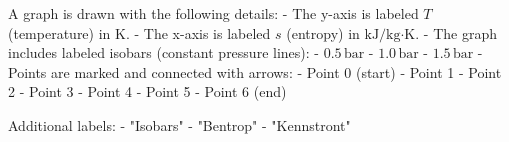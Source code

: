A graph is drawn with the following details:  
- The y-axis is labeled \( T \) (temperature) in \( \text{K} \).  
- The x-axis is labeled \( s \) (entropy) in \( \text{kJ/kg·K} \).  
- The graph includes labeled isobars (constant pressure lines):  
  - \( 0.5 \, \text{bar} \)  
  - \( 1.0 \, \text{bar} \)  
  - \( 1.5 \, \text{bar} \)  
- Points are marked and connected with arrows:  
  - Point 0 (start)  
  - Point 1  
  - Point 2  
  - Point 3  
  - Point 4  
  - Point 5  
  - Point 6 (end)  

Additional labels:  
- "Isobars"  
- "Bentrop"  
- "Kennstront"